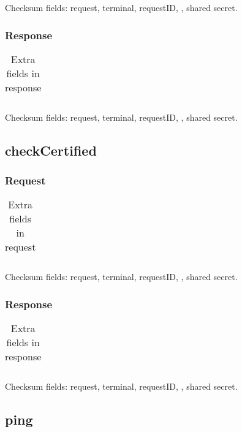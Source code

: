 \documentclass[a4paper,11pt]{article}
\newcommand{\code}[1]
   {\textsf{#1}}
\begin{document}
Checksum fields: request, terminal, requestID, , shared secret.

\subsubsection{Response}
\begin{table}[!h]
  \begin{tabular}{|l|l|}
    \hline
       \\\hline
  \end{tabular} 
  \caption{Extra fields in \code{} response}
\end{table}

Checksum fields: request, terminal, requestID, , shared secret.




\subsection{checkCertified}

\subsubsection{Request}
\begin{table}[!h]
  \begin{tabular}{|l|l|}
    \hline
       \\\hline
  \end{tabular} 
  \caption{Extra fields in \code{} request}
\end{table}

Checksum fields: request, terminal, requestID, , shared secret.

\subsubsection{Response}
\begin{table}[!h]
  \begin{tabular}{|l|l|}
    \hline
       \\\hline
  \end{tabular} 
  \caption{Extra fields in \code{} response}
\end{table}

Checksum fields: request, terminal, requestID, , shared secret.




\subsection{ping}
\end{document}
